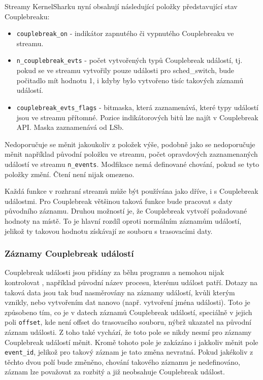 Streamy KernelSharku nyní obsahují následující položky představující stav Couplebreaku:
\begin{itemize}
    \item \texttt{couplebreak\_on} - indikátor zapnutého či vypnutého Couplebreaku ve streamu.
    \item \texttt{n\_couplebreak\_evts} - počet vytvořených typů Couplebreak událostí, tj. pokud se ve streamu vytvořily pouze události pro sched\_switch, bude počitadlo mít hodnotu 1, i kdyby bylo vytvořeno tisíc takových záznamů událostí.
    \item \texttt{couplebreak\_evts\_flags} - bitmaska, která zaznamenává, které typy událostí jsou ve streamu přítomné. Pozice indikátorových bitů lze najít v Couplebreak API. Maska zaznamenává od LSb.
\end{itemize}
Nedoporučuje se měnit jakoukoliv z položek výše, podobně jako se nedoporučuje měnit například původní položku ve streamu, počet opravdových zaznamenaných událostí ve streamu \texttt{n\_events}. Modfikace nemá definované chování, pokud se tyto položky změní. Čtení není nijak omezeno.

Každá funkce v rozhraní streamů může být používána jako dříve, i s Couplebreak událostmi. Pro Couplebreak většinou taková funkce bude pracovat s daty původního záznamu. Druhou možností je, že Couplebreak vytvoří požadované hodnoty na místě. To je hlavní rozdíl oproti normálním záznamům událostí, jelikož ty takovou hodnotu získávají ze souboru s trasovacími daty.

\subsubsection*{Záznamy Couplebreak událostí}

Couplebreak události jsou přidány za běhu programu a nemohou nijak kontrolovat , například původní název procesu, kterému událost patří. Dotazy na taková data jsou tak buď nasměrovány na záznamy událostí, kvůli kterým vznikly, nebo vytvořením dat nanovo (např. vytvoření jména události). Toto je způsobeno tím, co je v datech záznamů Couplebreak událostí, speciálně v jejich poli \texttt{offset}, kde není offset do trasovacího souboru, nýbrž ukazatel na původní záznam události. Z toho také vychází, že toto pole se nikdy nesmí pro záznamy Couplebreak událostí měnit. Kromě tohoto pole je zakázáno i jakkoliv měnit pole \texttt{event\_id}, jelikož pro takový záznam je tato změna nevratná. Pokud jakékoliv z těchto dvou polí bude změněno, chování takového záznamu je nedefinováno, záznam lze považovat za rozbitý a již neobsahuje Couplebreak událost.

